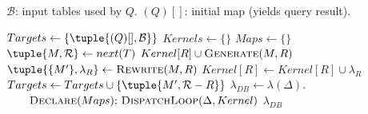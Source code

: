 \newcommand{\compile}{\ensuremath{\mbox{\sc Compile}}}
\newcommand{\generate}{\ensuremath{\mbox{\sc Generate}}}
\newcommand{\rewrite}{\ensuremath{\mbox{\sc Rewrite}}}
\newcommand{\substitute}{\ensuremath{\mbox{\sc Substitute}}}
\newcommand{\match}{\ensuremath{\mbox{\sc Match}}}


\def\RETURN{\STATE}


\begin{algorithm}
\caption{$\compile(Q)$}
\label{alg:compile}
\begin{codebox}
\zi {}
\zi {}
\zi {}
\zi \>$\mathcal{B}$: input tables used by $Q$.
\zi \>$(Q)[]$: initial map (yields query result).
\end{codebox}
\begin{algorithmic}[1]
\STATE $Targets \leftarrow \{\tuple{(Q)[],\mathcal{B}}\}$
\STATE $Kernels \leftarrow \{\}$
\STATE $Maps \leftarrow \{\}$
	\STATE $\tuple{M,\mathcal{R}} \leftarrow next(T)$
		\STATE $Kernel[R] \cup \generate(M,R)$
	\ELSE
			\STATE $\tuple{\{M'\}, \lambda_R} \leftarrow \rewrite(M,R)$
			\STATE $Kernel[R] \leftarrow Kernel[R] \cup \lambda_R$
			\STATE $Targets \leftarrow Targets \cup \{\tuple{M',\mathcal{R}-R}\}$
		\ENDFOR
	\ENDIF
\ENDWHILE
\STATE $\lambda_{DB} \leftarrow \lambda(\Delta).$\\
$\qquad \mbox{\sc Declare}(Maps)\mbox{; \sc
DispatchLoop}(\Delta, Kernel)$
\RETURN $\lambda_{DB}$
\end{algorithmic}
\end{algorithm}

